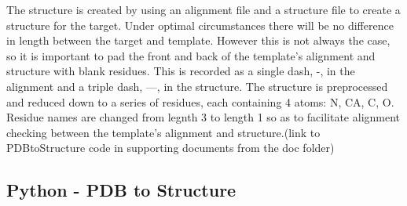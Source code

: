 \documentclass{article}
\begin{document}
The structure is created by using an alignment file and a structure file to create a structure for the target. Under optimal circumstances there will be no difference in length between the target and template. However this is not always the case, so it is important to pad the front and back of the template's alignment and structure with blank residues. This is recorded as a single dash, -, in the alignment and a triple dash, ---, in the structure. The structure is preprocessed and reduced down to a series of residues, each containing 4 atoms: N, CA, C, O. Residue names are changed from legnth 3 to length 1 so as to facilitate alignment checking between the template's alignment and structure.(link to PDBtoStructure code in supporting documents from the doc folder)

\newpage
\subsection{Python - PDB to Structure}
\end{document}

